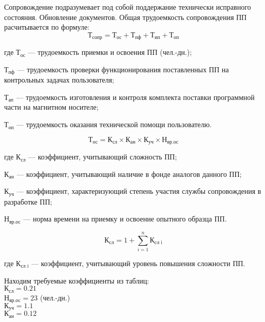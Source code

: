 Сопровождение подразумевает под собой поддержание технически исправного состояния.
Обновление документов. Общая трудоемкость сопровождения ПП расчитывается по формуле:
\begin{equation}
	\textrm{Т}_\textrm{сопр} = \textrm{Т}_\textrm{ос} + \textrm{Т}_\textrm{пф} + \textrm{Т}_\textrm{ип} + \textrm{Т}_\textrm{оп}
\end{equation}
\begin{ESKDexplanation}
	\item[где ]{} $\textrm{Т}_\textrm{ос}$ --- трудоемкость приемки и освоения ПП (чел.-дн.);
	\item{} $\textrm{Т}_\textrm{пф}$ --- трудоемкость проверки функционирования поставленных ПП на контрольных задачах пользователя;
	\item{} $\textrm{Т}_\textrm{ап}$ --- трудоемкость изготовления и контроля комплекта поставки программной части на магнитном носителе;
	\item{} $\textrm{Т}_\textrm{оп}$ --- трудоемкость оказания технической помощи пользователю.
\end{ESKDexplanation}
\begin{equation}
	\textrm{Т}_\textrm{ос}=\textrm{К}_\textrm{сл}\times{}\textrm{К}_\textrm{ан}\times{}\textrm{К}_\textrm{уч}\times{}\textrm{Н}_\textrm{вр.ос}
\end{equation}
\begin{ESKDexplanation}
	\item[где ]{} $\textrm{К}_\textrm{сл}$ --- коэффициент, учитывающий сложность ПП;
	\item{} $\textrm{К}_\textrm{ан}$ --- коэффициент, учитывающий наличие в фонде аналогов данного ПП;
	\item{} $\textrm{К}_\textrm{уч}$ --- коэффициент, характеризующий степень участия службы сопровождения в разработке ПП;
	\item{} $\textrm{Н}_\textrm{вр.ос}$ --- норма времени на приемку и освоение опытного образца ПП.
\end{ESKDexplanation}
\begin{equation}
	\textrm{К}_\textrm{сл} =1 + \sum_{i=1}^{n}\textrm{К}_\textrm{сл i}
\end{equation}
\begin{ESKDexplanation}
	\item[где ]{} $\textrm{К}_\textrm{сл i}$ --- коэффициент,  учитывающий уровень повышения сложности ПП.
\end{ESKDexplanation}
Находим требуемые коэффициенты из таблиц: \\
$\textrm{К}_\textrm{сл} = 0.21$ \\
$\textrm{Н}_\textrm{вр.ос} = 23$ (чел.-дн.) \\
$\textrm{К}_\textrm{уч} = 1.1$ \\
$\textrm{К}_\textrm{ан} = 0.12$



